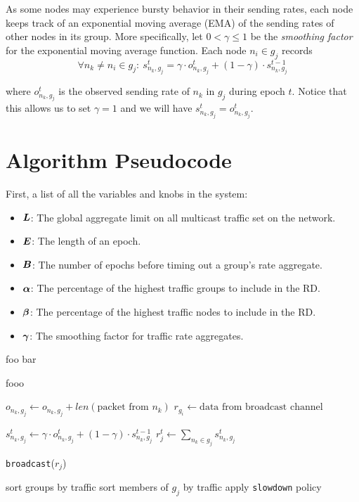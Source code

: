 \documentclass[lettersize,12pt]{article}
\begin{document}
As some nodes may experience bursty behavior in their sending rates, each node keeps track of an exponential moving average (EMA) of the sending rates of other nodes in its group. More specifically, let $0 < \gamma \leq 1$ be the \textit{smoothing factor} for the exponential moving average function. Each node $n_i \in g_j$ records
\[ \forall n_k \not = n_i \in g_j:\ s_{n_k, g_j}^t = \gamma \cdot o_{n_k, g_j}^t + (1 - \gamma) \cdot s_{n_k, g_j}^{t-1} \]

where $o_{n_k, g_j}^t$ is the observed sending rate of $n_k$ in $g_j$ during epoch $t$. Notice that this allows us to set $\gamma = 1$ and we will have $s_{n_k, g_j}^t = o_{n_k, g_j}^t$.


\section{Algorithm Pseudocode}
First, a list of all the variables and knobs in the system:
\begin{itemize}
\item \(\mbox{\boldmath $L$}\): The global aggregate limit on all multicast traffic set on the network.
\item \(\mbox{\boldmath $E$}\): The length of an epoch.
\item \(\mbox{\boldmath $B$}\): The number of epochs before timing out a group's rate aggregate.
\item \(\mbox{\boldmath $\alpha$}\): The percentage of the highest traffic groups to include in the RD.
\item \(\mbox{\boldmath $\beta$}\): The percentage of the highest traffic nodes to include in the RD.
\item \(\mbox{\boldmath $\gamma$}\): The smoothing factor for traffic rate aggregates.
\end{itemize}

\begin{algorithm}
foo bar
\caption{fooo}
\begin{algorithmic}[1]
\LOOP
   \STATE $o_{n_k, g_j} \gets o_{n_k, g_j} + len(\mbox{packet from $n_k$})$
   \STATE $r_{g_i} \gets \mbox{data from broadcast channel}$

         \STATE $s_{n_k, g_j}^t \gets \gamma \cdot o_{n_k, g_j}^t + (1 - \gamma) \cdot s_{n_k, g_j}^{t-1}$
         \STATE $r_j^t \gets \sum_{n_k \in g_j} s_{n_k, g_j}^t$
      \ENDFOR

         \STATE \verb|broadcast|($r_j$)
      \ENDIF

         \STATE sort groups by traffic
            \STATE sort members of $g_j$ by traffic
               \STATE apply \verb|slowdown| policy
            \ENDIF
         \ENDIF
      \ENDIF

   \ENDIF
\ENDLOOP
\end{algorithmic}
\end{algorithm}
\end{document}
